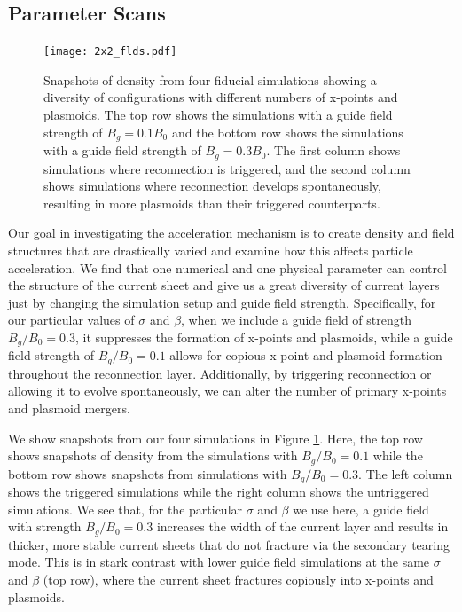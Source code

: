 \documentclass[iop,twocolappendix]{emulateapj}
\begin{document}
\subsection{Parameter Scans}

\begin{figure}[!h]
	\texttt{[image: 2x2\_flds.pdf]}
	\caption{Snapshots of density from four fiducial simulations showing a diversity of configurations with different numbers of x-points and plasmoids.  The top row shows the simulations with a guide field strength of $B_{g}=0.1B_{0}$ and the bottom row shows the simulations with a guide field strength of $B_{g}=0.3B_{0}$.  The first column shows simulations where reconnection is triggered, and the second column shows simulations where reconnection develops spontaneously, resulting in more plasmoids than their triggered counterparts.
	}
	\label{lowbeta_fourdens}
\end{figure}


Our goal in investigating the acceleration mechanism is to create density and field structures that are drastically varied and examine how this affects particle acceleration.  We find that one numerical and one physical parameter can control the structure of the current sheet and give us a great diversity of current layers just by changing the simulation setup and guide field strength.  Specifically, for our particular values of $\sigma$ and $\beta$, when we include a guide field of strength $B_{g}/B_{0}=0.3$, it suppresses the formation of x-points and plasmoids, while a guide field strength of $B_{g}/B_{0}=0.1$ allows for copious x-point and plasmoid formation throughout the reconnection layer.  Additionally, by triggering reconnection or allowing it to evolve spontaneously, we can alter the number of primary x-points and plasmoid mergers.

We show snapshots from our four simulations in Figure \ref{lowbeta_fourdens}.  Here, the top row shows snapshots of density from the simulations with $B_{g}/B_{0}=0.1$ while the bottom row shows snapshots from simulations with $B_{g}/B_{0}=0.3$.  The left column shows the triggered simulations while the right column shows the untriggered simulations.  We see that, for the particular $\sigma$ and $\beta$ we use here, a guide field with strength $B_{g}/B_{0}=0.3$ increases the width of the current layer and results in thicker, more stable current sheets that do not fracture via the secondary tearing mode.  This is in stark contrast with lower guide field simulations at the same $\sigma$ and $\beta$ (top row), where the current sheet fractures copiously into x-points and plasmoids.
 
\end{document}
